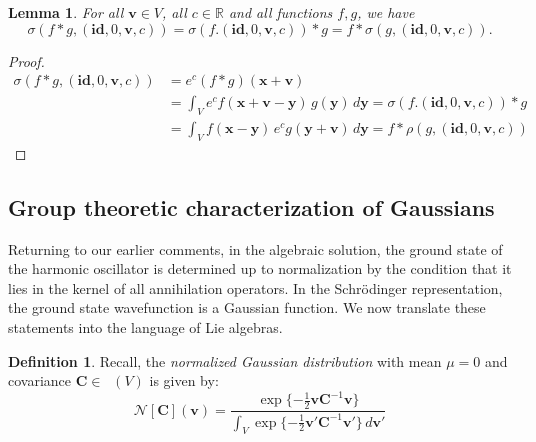 \documentclass[12pt]{article}
\newcounter{counter}
\theoremstyle{definition}
\newtheorem{dfn}[counter]{Definition}
\theoremstyle{plain}
\newtheorem{lem}[counter]{Lemma}
\newcommand{\Symp}{\mathop{\mathrm{Sym}_2^+}}
\begin{document}
\begin{lem}\label{lem:ConvAct2}
    For all \(\mathbf{v} \in V\), all \(c \in \mathbb{R}\) and all functions \(f,g\), we have
    \begin{equation}
        \sigma (f*g, (\mathbf{id}, 0, \mathbf{v}, c))
        = \sigma (f. (\mathbf{id}, 0, \mathbf{v}, c)) * g
        = f * \sigma (g, (\mathbf{id}, 0, \mathbf{v}, c)).
    \end{equation}
\end{lem}

\begin{proof}
    \begin{align}
        \sigma (f*g, (\mathbf{id}, 0, \mathbf{v}, c))
        &= e^c (f * g) (\mathbf{x} + \mathbf{v}) \\
    &= \int_V e^c f(\mathbf{x} + \mathbf{v} - \mathbf{y}) \,
    g (\mathbf{y}) \, d \mathbf{y} 
    = \sigma (f. (\mathbf{id}, 0, \mathbf{v}, c)) * g \\
    &= \int_V f(\mathbf{x}  - \mathbf{y}) \,
    e^c g (\mathbf{y} + \mathbf{v}) \, d \mathbf{y}
    = f * \rho (g, (\mathbf{id}, 0, \mathbf{v}, c))
    \end{align}
\end{proof} 
\subsection{Group theoretic characterization of Gaussians}

Returning to our earlier comments, in the algebraic solution, the ground state of the harmonic oscillator is determined up to normalization by the condition that it lies in the kernel of all annihilation operators.  In the Schr{\"o}dinger representation, the ground state wavefunction is a Gaussian function.  We now translate these statements into the language of Lie algebras.\\

\begin{dfn}
    Recall, the \emph{normalized Gaussian distribution} with mean $\mu=0$ and covariance $\mathbf{C}\in\Symp (V)$ is given by:
    \begin{equation}
        \mathcal{N} [\mathbf{C}] ( \mathbf{v})
        = \frac{\exp \{-\tfrac{1}{2}
        \mathbf{v} \mathbf{C}^{-1} \mathbf{v}\}}
        {\int_{V} \exp \{-\tfrac{1}{2}
        \mathbf{v'} \mathbf{C}^{-1} \mathbf{v'}\}
        \, d\mathbf{v'}}
    \end{equation}
\end{dfn}
\end{document}
